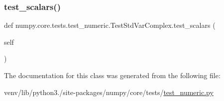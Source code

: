 \mbox{\label{classnumpy_1_1core_1_1tests_1_1test__numeric_1_1TestStdVarComplex_a199e7de5d7021bbf42f415b26767bccb}} 
\subsubsection{\texorpdfstring{test\+\_\+scalars()}{test\_scalars()}}
{\footnotesize\ttfamily def numpy.\+core.\+tests.\+test\+\_\+numeric.\+Test\+Std\+Var\+Complex.\+test\+\_\+scalars (\begin{DoxyParamCaption}\item[{}]{self }\end{DoxyParamCaption})}



The documentation for this class was generated from the following file\+:\begin{DoxyCompactItemize}
\item 
venv/lib/python3./site-\/packages/numpy/core/tests/\hyperlink{core_2tests_2test__numeric_8py}{test\+\_\+numeric.\+py}\end{DoxyCompactItemize}
